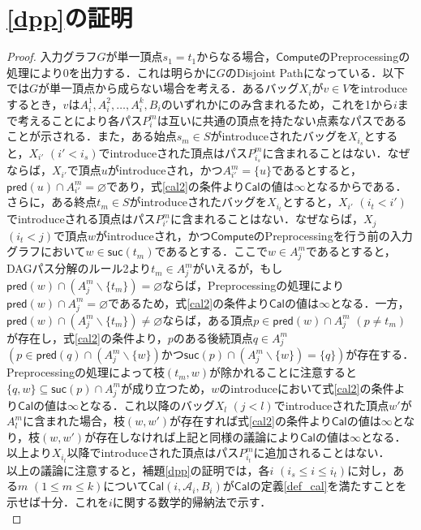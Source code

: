 \documentclass[master]{kuisthesis}		%
\theoremstyle{plain}
\theoremstyle{definition}
\begin{document}
{\section{\ref{dpp}の証明}

\begin{proof}
    入力グラフ$G$が単一頂点$s_1=t_1$からなる場合，$\mathsf{Compute}$のPreprocessingの処理により0を出力する．これは明らかに$G$のDisjoint Pathになっている．以下では$G$が単一頂点から成らない場合を考える．あるバッグ$X_i$が$v \in V$をintroduceするとき，$v$は$A^1_i, A^2_i,  \dots, A^k_i, B_i$のいずれかにのみ含まれるため，これを1から$i$まで考えることにより各パス$P^m_i$は互いに共通の頂点を持たない点素なパスであることが示される．また，ある始点$s_m \in S$がintroduceされたバッグを$X_{i_s}$とすると，$X_{i'}$ $(i' < i_s)$でintroduceされた頂点はパス$P^m_{i_s}$に含まれることはない．なぜならば，$X_{i'}$で頂点$u$がintroduceされ，かつ$A^m_{i'} = \{u\}$であるとすると，$\mathsf{pred}(u) \cap A^m_{i'} = \varnothing$であり，式\ref{cal2}の条件より$\mathsf{Cal}$の値は$\infty$となるからである．さらに，ある終点$t_m \in S$がintroduceされたバッグを$X_{i_t}$とすると，$X_{i'}$ $(i_t < i')$でintroduceされる頂点はパス$P^m_{i'}$に含まれることはない．なぜならば，$X_j$ $(i_t < j)$で頂点$w$がintroduceされ，かつ$\mathsf{Compute}$のPreprocessingを行う前の入力グラフにおいて$w \in \mathsf{suc}(t_m)$であるとする．ここで$w \in A^m_j$であるとすると，DAGパス分解のルール2より$t_m \in A^m_j$がいえるが，もし$\mathsf{pred}(w) \cap (A^m_j \backslash \{t_m\}) = \varnothing$ならば，Preprocessingの処理により$\mathsf{pred}(w) \cap A^m_j = \varnothing$であるため，式\ref{cal2}の条件より$\mathsf{Cal}$の値は$\infty$となる．一方，$\mathsf{pred}(w) \cap (A^m_j \backslash \{t_m\}) \neq \varnothing$ならば，ある頂点$p \in \mathsf{pred}(w) \cap A^m_j$ $(p \neq t_m)$が存在し，式\ref{cal2}の条件より，$p$のある後続頂点$q \in A^m_j$ $(p \in \mathsf{pred}(q) \cap (A^m_j \backslash \{w\}) \text{かつ} \mathsf{suc}(p) \cap (A^m_j \backslash \{w\}) = \{q\})$が存在する．Preprocessingの処理によって枝$(t_m, w)$が除かれることに注意すると$\{q, w\} \subseteq \mathsf{suc}(p) \cap A^m_j$が成り立つため，$w$のintroduceにおいて式\ref{cal2}の条件より$\mathsf{Cal}$の値は$\infty$となる．これ以降のバッグ$X_l$ $(j < l)$でintroduceされた頂点$w'$が$A^m_l$に含まれた場合，枝$(w, w')$が存在すれば式\ref{cal2}の条件より$\mathsf{Cal}$の値は$\infty$となり，枝$(w, w')$が存在しなければ上記と同様の議論により$\mathsf{Cal}$の値は$\infty$となる．以上より$X_{i_t}$以降でintroduceされた頂点はパス$P^m_{i_t}$に追加されることはない．\\
    以上の議論に注意すると，補題\ref{dpp}の証明では，各$i$ $(i_s \leq i \leq i_t)$に対し，ある$m$ $(1 \leq m \leq k)$について$\mathsf{Cal}(i, \mathscr{A}_i, B_i)$が$\mathsf{Cal}$の定義\ref{def_cal}を満たすことを示せば十分．これを$i$に関する数学的帰納法で示す．\\

\end{proof}}
\end{document}
